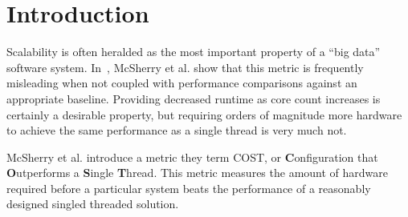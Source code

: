 \section{Introduction}
\label{sec:intro}

Scalability is often heralded as the most important property of a ``big data''
software system. In~\cite{McSherryCOST}, McSherry et al. show that this metric
is frequently misleading when not coupled with performance comparisons against
an appropriate baseline. Providing decreased runtime as core count increases is
certainly a desirable property, but requiring orders of magnitude more hardware
to achieve the same performance as a single thread is very much not.

McSherry et al. introduce a metric they term COST, or \textbf{C}onfiguration
that \textbf{O}utperforms a \textbf{S}ingle \textbf{T}hread. This metric
measures the amount of hardware required before a particular system beats the
performance of a reasonably designed singled threaded solution.
